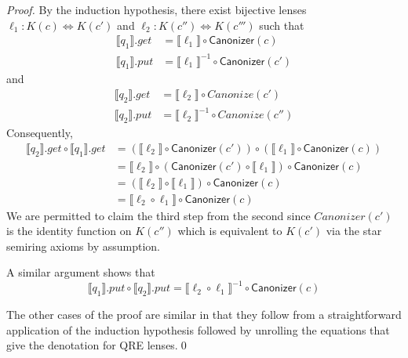 \documentclass{svproc}
\newcommand{\kw}[1]{\ensuremath{\mathsf{#1}}}
\newcommand{\canonizer}{\ensuremath{\kw{Canonizer}}}
\begin{document}
\begin{proof}
  By the induction hypothesis, there exist bijective lenses
  $\ell_1 :
  K(c) \Leftrightarrow K(c')$ and $\ell_2 : K(c'') \Leftrightarrow K(c''')$ such
  that
  \begin{align*}
\llbracket q_1 \rrbracket.get &= \llbracket \ell_1 \rrbracket \circ
\canonizer(c)\\
\llbracket q_1 \rrbracket.put &= {\llbracket \ell_1 \rrbracket}^{-1} \circ
\canonizer(c')
\end{align*}
and
\begin{align*}
\llbracket q_2 \rrbracket.get &= \llbracket \ell_2 \rrbracket \circ
Canonize(c')\\
\llbracket q_2 \rrbracket.put &= {\llbracket \ell_2 \rrbracket}^{-1} \circ
Canonize(c'')
\end{align*}
Consequently,
\begin{align*}
\llbracket q_2 \rrbracket.get \circ \llbracket q_1 \rrbracket.get &=
(\llbracket \ell_2 \rrbracket \circ \canonizer(c')) \circ (\llbracket \ell_1
\rrbracket \circ \canonizer(c))\\
&= \llbracket \ell_2 \rrbracket \circ (\canonizer(c') \circ \llbracket \ell_1
\rrbracket) \circ \canonizer(c)\\
&= (\llbracket \ell_2 \rrbracket \circ \llbracket \ell_1 \rrbracket) \circ
\canonizer(c)\\
&= \llbracket \ell_2  \circ  \ell_1 \rrbracket \circ
\canonizer(c)
\end{align*} 
We are permitted to claim the third step from the second since
$\mathit{Canonizer(c')}$ is the identity function on $K(c'')$ which is
equivalent to $K(c')$ via the star semiring axioms by assumption.

A similar argument shows that 
$$\llbracket q_1 \rrbracket.put \circ \llbracket q_2 \rrbracket.put =
\llbracket \ell_2  \circ  \ell_1 \rrbracket^{-1} \circ
\canonizer(c)$$

The other cases of the proof are similar in that they follow from a
straightforward application of the induction hypothesis followed by unrolling
the equations that give the denotation for QRE lenses.\qed
\end{proof}
\iffalse
\end{document}
